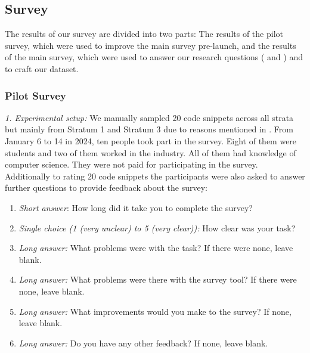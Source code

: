 \documentclass[%
class=scrreprt,
chapterprefix=false,%
open=right,%
twoside=false,%
paper=a4,%
logofile={Logo\_zentral\_farbig\_EN.png},%
thesistype=master,%
UKenglish,%
]{se2thesis}
\theoremstyle{definition}
\newcommand{\rdh}{REDEC\xspace}
\begin{document}
\subsection{Survey} \label{Survey}
	The results of our survey are divided into two parts: The results of the pilot survey, which were used to improve the main survey pre-launch, and the results of the main survey, which were used to answer our research questions ( and ) and to craft our dataset.
	
\subsubsection{Pilot Survey} \label{Pilot Survey}
	
	\textit{1. Experimental setup:}
	We manually sampled 20 code snippets across all strata but mainly from Stratum 1 and Stratum 3 due to reasons mentioned in . From January 6 to 14 in 2024, ten people took part in the survey. Eight of them were students and two of them worked in the industry. All of them had knowledge of computer science. They were not paid for participating in the survey. Additionally to rating 20 code snippets the participants were also asked to answer further questions to provide feedback about the survey:
	
	\begin{enumerate}
		\item \textit{Short answer}: How long did it take you to complete the survey?
		\item \textit{Single choice (1 (very unclear) to 5 (very clear)):} How clear was your task?
		\item \textit{Long answer:} What problems were with the task? If there were none, leave blank.
		\item \textit{Long answer:} What problems were there with the survey tool? If there were none, leave blank.
		\item \textit{Long answer:} What improvements would you make to the survey? If none, leave blank.
		\item \textit{Long answer:} Do you have any other feedback? If none, leave blank.
	\end{enumerate}
	
	
	
\end{document}
